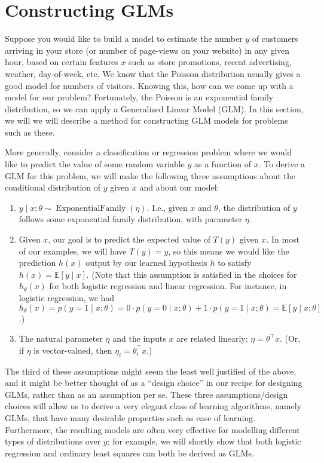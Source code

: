 \section{Constructing GLMs}
Suppose you would like to build a model to estimate the number $y$ of customers
arriving in your store (or number of page-views on your website) in
any given hour, based on certain features $x$ such as store promotions, recent
advertising, weather, day-of-week, etc. We know that the Poisson distribution
usually gives a good model for numbers of visitors. Knowing this, how
can we come up with a model for our problem? Fortunately, the Poisson is an
exponential family distribution, so we can apply a Generalized Linear Model
(GLM). In this section, we will we will describe a method for constructing
GLM models for problems such as these.

More generally, consider a classification or regression problem where we
would like to predict the value of some random variable $y$ as a function of
$x$. To derive a GLM for this problem, we will make the following three
assumptions about the conditional distribution of $y$ given $x$ and about our
model:
\begin{enumerate}
    \item $y \mid x;\theta \sim \operatorname{ExponentialFamily}(\eta)$. I.e., given $x$ and $\theta$, the distribution of
$y$ follows some exponential family distribution, with parameter $\eta$.
    \item Given $x$, our goal is to predict the expected value of $T(y)$ given $x$.
    In most of our examples, we will have $T(y) = y$, so this means we
    would like the prediction $h(x)$ output by our learned hypothesis $h$ to
    satisfy $h(x) = \mathbb E[y \mid x]$. (Note that this assumption is satisfied in the
    choices for $h_\theta (x)$ for both logistic regression and linear regression. For
    instance, in logistic regression, we had $h_\theta (x) = p(y = 1 \mid x;\theta) = 0 \cdot p(y =
        0 \mid x;\theta) + 1 \cdot p(y = 1 \mid x;\theta) = \mathbb E[y \mid x;\theta]$.)

    \item The natural parameter $\eta$ and the inputs $x$ are related linearly: $\eta = \theta^\top x$.
    (Or, if $\eta$ is vector-valued, then $\eta_i = \theta^\top_i x$.)
\end{enumerate}

The third of these assumptions might seem the least well justified of
the above, and it might be better thought of as a ``design choice'' in our
recipe for designing GLMs, rather than as an assumption per se. These
three assumptions/design choices will allow us to derive a very elegant class
of learning algorithms, namely GLMs, that have many desirable properties
such as ease of learning. Furthermore, the resulting models are often very
effective for modelling different types of distributions over $y$; for example, we
will shortly show that both logistic regression and ordinary least squares can
both be derived as GLMs.

